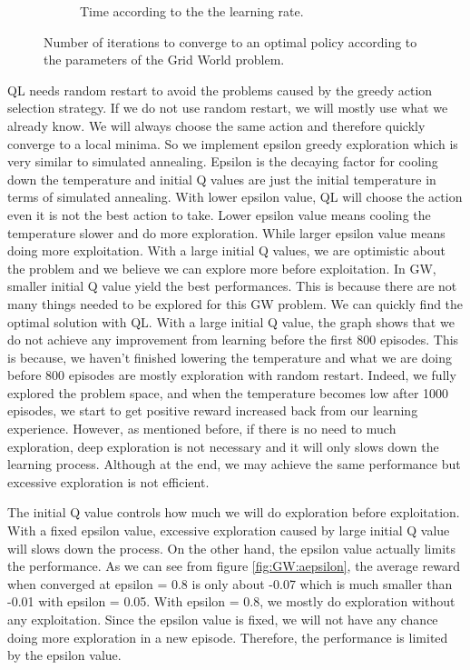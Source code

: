 \documentclass[10pt, twocolumn]{article}
\begin{document}
\begin{figure}[]
\begin{subfigure}[t]{0.49\textwidth}
					\caption{Time according to the the learning rate.}
					\label{fig:GW:rate}
				\end{subfigure}
				\caption{Number of iterations to converge to an optimal policy according to the parameters of the Grid World problem.}
				\label{fig:GW:QL}
			\end{figure}

			QL needs random restart to avoid the problems caused by the greedy action selection strategy.  If we do not use random restart, we will mostly use what we already know. We will always choose the same action and therefore quickly converge to a local minima. So we implement epsilon greedy exploration which is very similar to simulated annealing. Epsilon is the decaying factor for cooling down the temperature and initial Q values are just the initial temperature in terms of simulated annealing. With lower epsilon value, QL will choose the action even it is not the best action to take. Lower epsilon value means cooling the temperature slower and do more exploration. While larger epsilon value means doing more exploitation. With a large initial Q values, we are optimistic about the problem and we believe we can explore more before exploitation. In GW, smaller initial Q value yield the best performances. This is because there are not many things needed to be explored for this GW problem. We can quickly find the optimal solution with QL. With a large initial Q value, the graph shows that we do not achieve any improvement from learning before the first 800 episodes. This is because, we haven't finished lowering the temperature and what we are doing before 800 episodes are mostly exploration with random restart. Indeed, we fully explored the problem space, and when the temperature becomes low after 1000 episodes, we start to get positive reward increased back from our learning experience. However, as mentioned before, if there is no need to much exploration, deep exploration is not necessary and it will only slows down the learning process. Although at the end, we may achieve the same performance but excessive exploration is not efficient.

			The initial Q value controls how much we will do exploration before exploitation. With a fixed epsilon value, excessive exploration caused by large initial Q value will slows down the process. On the other hand, the epsilon value actually limits the performance. As we can see from figure \ref{fig:GW:aepsilon}, the average reward when converged at epsilon = 0.8 is only about -0.07 which is much smaller than -0.01 with epsilon = 0.05. With epsilon = 0.8, we mostly do exploration without any exploitation. Since the epsilon value is fixed, we will not have any chance doing more exploration in a new episode. Therefore, the performance is limited by the epsilon value.
\end{document}

